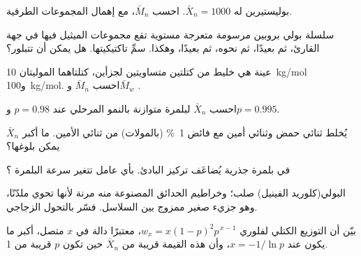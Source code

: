 \begin{exercise}[$\star$]\label{exo:b2:polymer-synthesis:3}
بوليستيرين له $\bar X_n = 1000$. احسب $\bar M_n$، مع إهمال المجموعات الطرفية.
\end{exercise}

\begin{exercise}[$\star$]\label{exo:b2:polymer-synthesis:4}
سلسلة بولي بروبين مرسومة متعرجة مستوية تقع مجموعات الميثيل فيها في جهة القارئ، ثم
بعيدًا، ثم نحوه، ثم بعيدًا، وهكذا. سمِّ تاكتيكيتها. هل يمكن أن تتبلور؟
\end{exercise}

\begin{exercise}[$\star\star$]\label{exo:b2:polymer-synthesis:5}
عينة هي خليط من كتلتين متساويتين لجزأين، كتلتاهما الموليتان \qty{10}{kg/mol} 
و\qty{100}{kg/mol}. احسب $\bar M_n$ و$\bar M_w$ .
\end{exercise}

\begin{exercise}[$\star\star$]\label{exo:b2:polymer-synthesis:6}
احسب $\bar X_n$ لبلمرة متوازنة بالنمو المرحلي عند $p = 0.98$ و$p = 0.995$.
\end{exercise}

\begin{exercise}[$\star\star$]\label{exo:b2:polymer-synthesis:7}
يُخلط ثنائي حمض وثنائي أمين مع فائض 1~\% (بالمولات) من ثنائي الأمين. ما أكبر
$\bar X_n$ يمكن بلوغها؟
\end{exercise}

\begin{exercise}[$\star\star$]\label{exo:b2:polymer-synthesis:8}
في بلمرة جذرية يُضاعَف تركيز البادئ. بأي عامل تتغير سرعة
البلمرة ؟
\end{exercise}

\begin{exercise}[$\star\star$]\label{exo:b2:polymer-synthesis:9}
البولي(كلوريد الفينيل) صلب؛ وخراطيم الحدائق المصنوعة منه مرنة لأنها تحوي ملدّنًا،
وهو جزيء صغير ممزوج بين السلاسل. فسّر بالتحول الزجاجي.
\end{exercise}

\begin{exercise}[$\star\star\star$]\label{exo:b2:polymer-synthesis:10}
بيّن أن التوزيع الكتلي لفلوري $w_x = x(1-p)^2p^{\,x-1}$، معتبرًا دالة في $x$
متصل، أكبر ما يكون عند $x = -1/\ln p$، وأن هذه القيمة قريبة من $\bar X_n$ حين تكون $p$ قريبة من 1.
\end{exercise}

